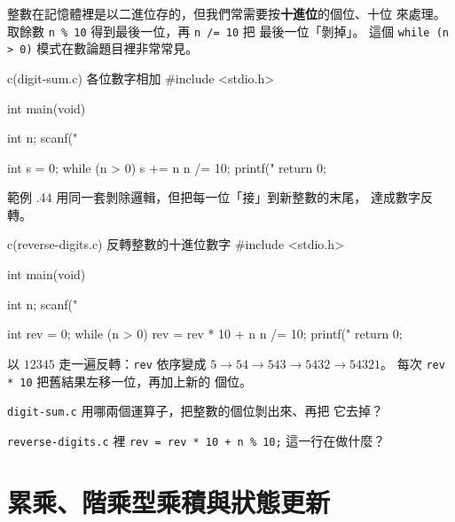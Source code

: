 整數在記憶體裡是以二進位存的，但我們常需要按\textbf{十進位}的個位、十位
來處理。 取餘數 \texttt{n \% 10} 得到最後一位，再 \texttt{n /= 10} 把
最後一位「剝掉」。 這個 \texttt{while (n > 0)} 模式在數論題目裡非常常見。

\begin{example}{c}{(digit-sum.c) 各位數字相加}
#include <stdio.h>

int main(void) {
    int n;
    scanf("%

    int s = 0;
    while (n > 0) {
        s += n %
        n /= 10;
    }
    printf("%
    return 0;
}
\end{example}


範例 \thechapter.44 用同一套剝除邏輯，但把每一位「接」到新整數的末尾，
達成數字反轉。

\begin{example}{c}{(reverse-digits.c) 反轉整數的十進位數字}
#include <stdio.h>

int main(void) {
    int n;
    scanf("%

    int rev = 0;
    while (n > 0) {
        rev = rev * 10 + n %
        n /= 10;
    }
    printf("%
    return 0;
}
\end{example}


以 $12345$ 走一遍反轉：\texttt{rev} 依序變成 $5 \to 54 \to 543 \to
5432 \to 54321$。 每次 \texttt{rev * 10} 把舊結果左移一位，再加上新的
個位。


\begin{drills}[label=drills:loop-digits]
\item \texttt{digit-sum.c} 用哪兩個運算子，把整數的個位剝出來、再把
它去掉？
\item \texttt{reverse-digits.c} 裡 \texttt{rev = rev * 10 + n \% 10;}
這一行在做什麼？
\end{drills}

\section{累乘、階乘型乘積與狀態更新}
\label{sec:loop-product}

